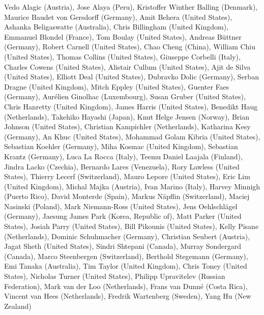 Vedo Alagic (Austria),
Jose Alaya (Peru),
Kristoffer Winther Balling (Denmark),
Maurice Baudet von Gersdorff (Germany),
Amit Behera (United States),
Ashanka Beligaswatte (Australia),
Chris Billingham (United Kingdom),
Emmanuel Blondel (France),
Tom Boulay (United States),
Andreas Büttner (Germany),
Robert Carnell (United States),
Chao Cheng (China),
William Chiu (United States),
Thomas Collins (United States),
Giuseppe Corbelli (Italy),
Charles Cowens (United States),
Alistair Cullum (United States),
Ajit de Silva (United States),
Elliott Deal (United States),
Dubravko Dolic (Germany),
Serban Dragne (United Kingdom),
Mitch Eppley (United States),
Guenter Faes (Germany),
Aurélien Ginolhac (Luxembourg),
Susan Gruber (United States),
Chris Hanretty (United Kingdom),
James Harris (United States),
Benedikt Haug (Netherlands),
Takehiko Hayashi (Japan),
Knut Helge Jensen (Norway),
Brian Johnson (United States),
Christian Kampichler (Netherlands),
Katharina Kesy (Germany),
An Khuc (United States),
Mohammad Golam Kibria (United States),
Sebastian Koehler (Germany),
Miha Kosmac (United Kingdom),
Sebastian Krantz (Germany),
Luca La Rocca (Italy),
Teemu Daniel Laajala (Finland),
Jindra Lacko (Czechia),
Bernardo Lares (Venezuela),
Rory Lawless (United States),
Thierry Lecerf (Switzerland),
Mauro Lepore (United States),
Eric Lim (United Kingdom),
Michal Majka (Austria),
Ivan Marino (Italy),
Harvey Minnigh (Puerto Rico),
David Monterde (Spain),
Markus Näpflin (Switzerland),
Maciej Nasinski (Poland),
Mark Niemann-Ross (United States),
Jens Oehlschlägel (Germany),
Jaesung James Park (Korea, Republic of),
Matt Parker (United States),
Josiah Parry (United States),
Bill Pikounis (United States),
Kelly Pisane (Netherlands),
Dominic Schuhmacher (Germany),
Christian Seubert (Austria),
Jagat Sheth (United States),
Sindri Shtepani (Canada),
Murray Sondergard (Canada),
Marco Steenbergen (Switzerland),
Berthold Stegemann (Germany),
Emi Tanaka (Australia),
Tim Taylor (United Kingdom),
Chris Toney (United States),
Nicholas Turner (United States),
Philipp Upravitelev (Russian Federation),
Mark van der Loo (Netherlands),
Frans van Dunné (Costa Rica),
Vincent van Hees (Netherlands),
Fredrik Wartenberg (Sweden),
Yang Hu (New Zealand)


\address{%
Torsten Hothorn\\
Universität Zürich\\%
Switzerland\\
%
%
\textit{ORCiD: \href{https://orcid.org/0000-0001-8301-0471}{0000-0001-8301-0471}}\\%
\href{mailto:Torsten.Hothorn@R-project.org}{\nolinkurl{Torsten.Hothorn@R-project.org}}%
}
